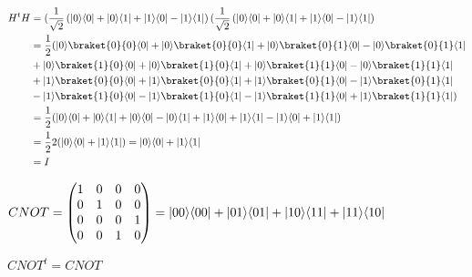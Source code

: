 \documentclass[osajnl,preprint,showpacs,superscriptaddress,10pt]{revtex4-1} %
\DeclarePairedDelimiter\bra{\langle}{\rvert}
\DeclarePairedDelimiter\ket{\lvert}{\rangle}
\begin{document}
\begin{fleqn}[\parindent]
\begin{equation}
\begin{split}
    H^t H
        &= (\frac{1}{\sqrt{2}} \left (\ket{0}\bra{0} + \ket{0}\bra{1} + \ket{1}\bra{0} -\ket{1}\bra{1} \right) (\frac{1}{\sqrt{2}} \left (\ket{0}\bra{0} + \ket{0}\bra{1} + \ket{1}\bra{0} -\ket{1}\bra{1} \right) \\
        &= \frac{1}{2} (\ket{0} \braket{0}{0} \bra{0} + \ket{0} \braket{0}{0} \bra{1} + \ket{0} \braket{0}{1} \bra{0} - \ket{0} \braket{0}{1} \bra{1} \\
        &+ \ket{0} \braket{1}{0} \bra{0} + \ket{0} \braket{1}{0} \bra{1} + \ket{0} \braket{1}{1} \bra{0} - \ket{0} \braket{1}{1} \bra{1} \\
        &+ \ket{1} \braket{0}{0} \bra{0} + \ket{1} \braket{0}{0} \bra{1} + \ket{1} \braket{0}{1} \bra{0} - \ket{1} \braket{0}{1} \bra{1} \\
        &- \ket{1} \braket{1}{0} \bra{0} - \ket{1} \braket{1}{0} \bra{1} - \ket{1} \braket{1}{1} \bra{0} + \ket{1} \braket{1}{1} \bra{1}) \\
        &= \frac{1}{2} (\ket{0} \bra{0} + \ket{0} \bra{1} + \ket{0} \bra{0} - \ket{0} \bra{1} + \ket{1} \bra{0} + \ket{1} \bra{1} - \ket{1} \bra{0} + \ket{1} \bra{1}) \\
        &= \frac{1}{2} 2 (\ket{0} \bra{0} + \ket{1} \bra{1}) = \ket{0} \bra{0} + \ket{1} \bra{1} \\
        &= I
\end{split}
\end{equation}
\end{fleqn}


$CNOT =
\begin{pmatrix}
    1 & 0 & 0 & 0 \\
    0 & 1 & 0 & 0 \\
    0 & 0 & 0 & 1 \\
    0 & 0 & 1 & 0
\end{pmatrix} = \ket{00} \bra{00} + \ket{01} \bra{01} + \ket{10} \bra{11} + \ket{11} \bra{10}$

$CNOT^t = CNOT$
\end{document}
